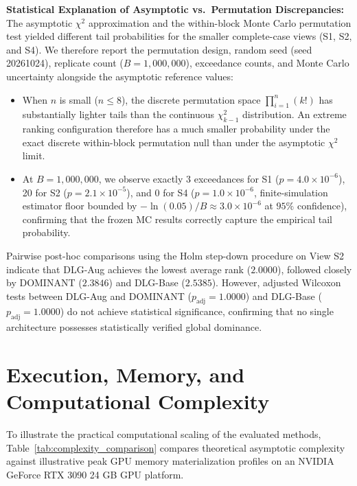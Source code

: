 \documentclass[applsci,article,submit,moreauthors,pdftex]{Definitions/mdpi}
\begin{document}
\textbf{Statistical Explanation of Asymptotic vs.\ Permutation Discrepancies:}
The asymptotic $\chi^2$ approximation and the within-block Monte Carlo permutation test yielded different tail probabilities for the smaller complete-case views (S1, S2, and S4). We therefore report the permutation design, random seed (seed 20261024), replicate count ($B=1{,}000{,}000$), exceedance counts, and Monte Carlo uncertainty alongside the asymptotic reference values:
\begin{itemize}
    \item When $n$ is small ($n \le 8$), the discrete permutation space $\prod_{i=1}^n (k!)$ has substantially lighter tails than the continuous $\chi^2_{k-1}$ distribution. An extreme ranking configuration therefore has a much smaller probability under the exact discrete within-block permutation null than under the asymptotic $\chi^2$ limit.
    \item At $B=1{,}000{,}000$, we observe exactly 3 exceedances for S1 ($p = 4.0 \times 10^{-6}$), 20 for S2 ($p = 2.1 \times 10^{-5}$), and 0 for S4 ($p = 1.0 \times 10^{-6}$, finite-simulation estimator floor bounded by $-\ln(0.05)/B \approx 3.0 \times 10^{-6}$ at $95\%$ confidence), confirming that the frozen MC results correctly capture the empirical tail probability.
\end{itemize}

Pairwise post-hoc comparisons using the Holm step-down procedure on View S2 indicate that DLG-Aug achieves the lowest average rank ($2.0000$), followed closely by DOMINANT ($2.3846$) and DLG-Base ($2.5385$). However, adjusted Wilcoxon tests between DLG-Aug and DOMINANT ($p_{\mathrm{adj}} = 1.0000$) and DLG-Base ($p_{\mathrm{adj}} = 1.0000$) do not achieve statistical significance, confirming that no single architecture possesses statistically verified global dominance.

\section{Execution, Memory, and Computational Complexity}
\label{sec:execution_complexity}
To illustrate the practical computational scaling of the evaluated methods, Table~\ref{tab:complexity_comparison} compares theoretical asymptotic complexity against illustrative peak GPU memory materialization profiles on an NVIDIA GeForce RTX 3090 24 GB GPU platform.
\end{document}
